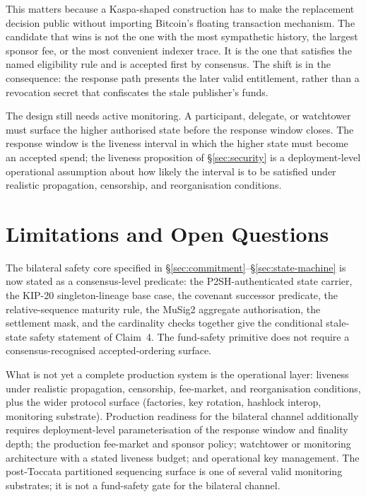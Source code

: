 \documentclass[10pt,a4paper]{article}
\begin{document}
This matters because a Kaspa-shaped construction has to make the replacement decision public without importing Bitcoin's floating transaction mechanism. The candidate that wins is not the one with the most sympathetic history, the largest sponsor fee, or the most convenient indexer trace. It is the one that satisfies the named eligibility rule and is accepted first by consensus. The shift is in the consequence: the response path presents the later valid entitlement, rather than a revocation secret that confiscates the stale publisher's funds.

The design still needs active monitoring. A participant, delegate, or watchtower must surface the higher authorised state before the response window closes. The response window is the liveness interval in which the higher state must become an accepted spend; the liveness proposition of §\ref{sec:security} is a deployment-level operational assumption about how likely the interval is to be satisfied under realistic propagation, censorship, and reorganisation conditions.

\section{Limitations and Open Questions}
\label{sec:limits}

The bilateral safety core specified in §\ref{sec:commitment}--§\ref{sec:state-machine} is now stated as a consensus-level predicate: the P2SH-authenticated state carrier, the KIP-20 singleton-lineage base case, the covenant successor predicate, the relative-sequence maturity rule, the MuSig2 aggregate authorisation, the settlement mask, and the cardinality checks together give the conditional stale-state safety statement of Claim~4. The fund-safety primitive does not require a consensus-recognised accepted-ordering surface.

What is not yet a complete production system is the operational layer: liveness under realistic propagation, censorship, fee-market, and reorganisation conditions, plus the wider protocol surface (factories, key rotation, hashlock interop, monitoring substrate). Production readiness for the bilateral channel additionally requires deployment-level parameterisation of the response window and finality depth; the production fee-market and sponsor policy; watchtower or monitoring architecture with a stated liveness budget; and operational key management. The post-Toccata partitioned sequencing surface is one of several valid monitoring substrates; it is not a fund-safety gate for the bilateral channel.
\end{document}
